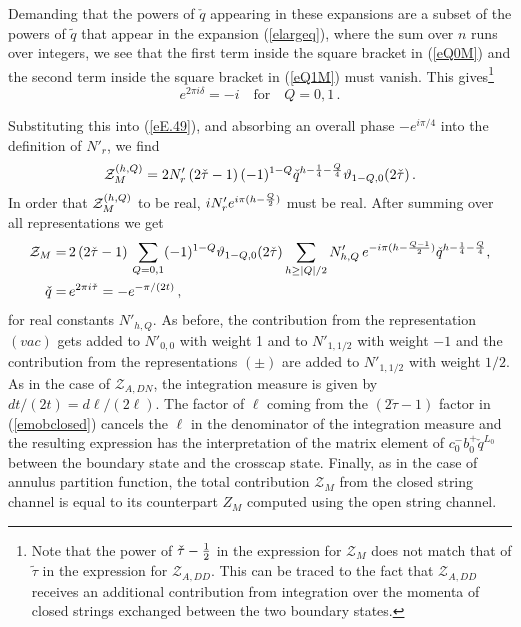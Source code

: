 \documentclass[12pt,a4paper]{article}
\newcommand{\be}{\begin{equation}}
\newcommand{\ee}{\end{equation}}
\newcommand{\refb}[1]{(\ref{#1})}
\newcommand{\vt}{\vartheta}
\newcommand{\cZ}{\mathcal{Z}}
\begin{document}
Demanding that the powers of $\check q$ appearing in these expansions are a subset
of the powers of $\tilde q$ that appear in the expansion \refb{elargeq}, where the sum
over $n$ runs over integers, we see that the first term inside the square bracket in \refb{eQ0M}
and the second term inside the square bracket in \refb{eQ1M} must vanish. This gives\footnote{Note
that the power of $\check \tau -{1\over 2}$ in the expression for $\cZ_{M}$ does not match
that of $\tilde \tau$ in the expression for $\cZ_{A,DD}$. This can be traced to the fact that
$\cZ_{A,DD}$ receives an additional contribution from integration over the momenta of closed strings
exchanged between the two boundary states.}
\be
e^{2\pi i\delta}=-i \quad \text{for} \quad Q=0,1 \, .
\ee

Substituting this into \refb{eE.49}, and absorbing an overall phase
$-e^{i\pi/4}$ into the definition of $N'_r$, we find
\begin{align}
\ZZhQ_{M} = 2 N'_r  \, (2 \check \tau -1) \, (-1)^{1-Q} \check q^{h
-{1 \over 4} - {Q \over 4}} \vt_{1-Q,0} (2 \check \tau) \, .
\end{align}
In order that ${\mathcal Z}^{(h,Q)}_{M}$ to be real, $i  N'_r e^{i\pi (h-{Q\over 2})}$ must be real.
After summing over all representations we get
\be
\begin{split}
\label{emobclosed}
\cZ_{M}  = &\, 2 \, (2 \check \tau -1) \, \sum_{Q=0,1}  (-1)^{1-Q}  \vt_{1-Q,0} (2 \check \tau)
\sum_{h\ge |Q|/2} N'_{h,Q}  \, e^{-i\pi (h-{Q-1\over 2})}  \check q^{h-{1 \over 4} - {Q \over 4}},
\\
\check q =&\,  e^{2\pi i\check\tau}=- e^{-\pi / (2t)} \, ,
\end{split}
\ee
for real constants $N'_{h,Q}$.
As before,
the contribution from the representation $(vac)$
gets added to $N'_{0,0}$ with weight 1 and to $N'_{1,1/2}$ with weight $-1$ and the
contribution from the representations $(\pm )$ are added to $N'_{1,1/2}$ with weight $1/2$.
As in the case of $\cZ_{A,DN}$, the integration measure is given by $dt/(2t)=d\ell/(2\ell)$.
The factor of $\ell$ coming from the $(2 \check \tau -1)$ factor in \refb{emobclosed}
cancels the $\ell$ in the denominator of the integration measure and the
resulting expression has the interpretation of the matrix element of
$c_0^-b_0^+\check q^{L_0}$ between the boundary state and the crosscap state. Finally,
as in the case of annulus partition function, the total contribution $\cZ_M$ from the closed
string channel is equal to its counterpart $Z_M$ computed using the open string
channel.
\end{document}
